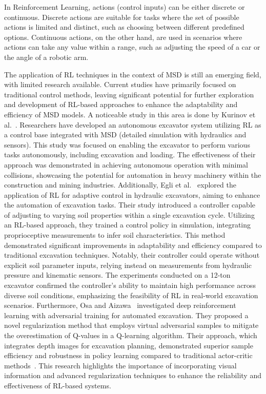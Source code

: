 In Reinforcement Learning, actions (control inputs) can be either discrete or continuous. Discrete actions are suitable for tasks where the set of possible actions is limited and distinct, such as choosing between different predefined options. Continuous actions, on the other hand, are used in scenarios where actions can take any value within a range, such as adjusting the speed of a car or the angle of a robotic arm. 

The application of RL techniques in the context of MSD is still an emerging field, with limited research available. Current studies have primarily focused on traditional control methods, leaving significant potential for further exploration and development of RL-based approaches to enhance the adaptability and efficiency of MSD models. A noticeable study in this area is done by Kurinov et al.~\cite{kurinov2020autoexcavator}. Researchers have developed an autonomous excavator system utilizing RL as a control base integrated with MSD (detailed simulation with hydraulics and sensors). This study was focused on enabling the excavator to perform various tasks autonomously, including excavation and loading. The effectiveness of their approach was demonstrated in achieving autonomous operation with minimal collisions, showcasing the potential for automation in heavy machinery within the construction and mining industries.  
Additionally, Egli et al.~\cite{egli2022soil} explored the application of RL for adaptive control in hydraulic excavators, aiming to enhance the automation of excavation tasks. Their study introduced a controller capable of adjusting to varying soil properties within a single excavation cycle. Utilizing an RL-based approach, they trained a control policy in simulation, integrating proprioceptive measurements to infer soil characteristics. This method demonstrated significant improvements in adaptability and efficiency compared to traditional excavation techniques. Notably, their controller could operate without explicit soil parameter inputs, relying instead on measurements from hydraulic pressure and kinematic sensors. The experiments conducted on a 12-ton excavator confirmed the controller's ability to maintain high performance across diverse soil conditions, emphasizing the feasibility of RL in real-world excavation scenarios.
Furthermore, Osa and Aizawa~\cite{osa2022deep} investigated deep reinforcement learning with adversarial training for automated excavation. They proposed a novel regularization method that employs virtual adversarial samples to mitigate the overestimation of Q-values in a Q-learning algorithm. Their approach, which integrates depth images for excavation planning, demonstrated superior sample efficiency and robustness in policy learning compared to traditional actor-critic methods~\cite{sutton_reinforcement_2018}. This research highlights the importance of incorporating visual information and advanced regularization techniques to enhance the reliability and effectiveness of RL-based systems.

